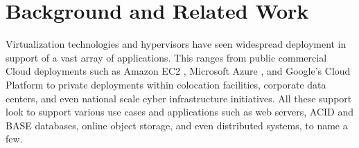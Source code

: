 \documentclass[10pt]{sigplanconf}
\begin{document}





 


\section{Background and Related Work}\label{Background}


Virtualization technologies and hypervisors have seen widespread deployment in support of a vast array of applications.  This ranges from public commercial Cloud deployments such as Amazon EC2 \cite{amazon2010}, Microsoft Azure \cite{jennings2010cloud}, and Google's Cloud Platform \cite{www-google-platform} to private deployments within colocation facilities, corporate data centers, and even national scale cyber infrastructure initiatives.  All these support look to support various use cases and applications such as web servers, ACID and BASE databases, online object storage, and even distributed systems, to name a few.  
\end{document}
